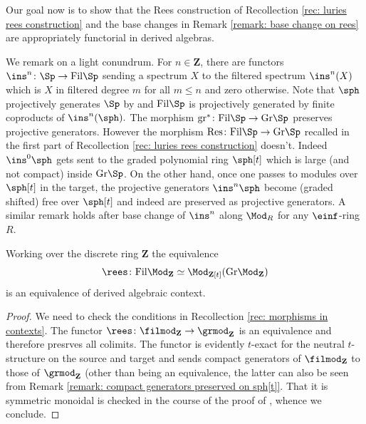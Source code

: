 \documentclass[10pt,reqno]{amsart}
\numberwithin{equation}{section}
\newcommand{\ZZ}{\mathbf{Z}}
\newcommand{\Gr}{\mathrm{Gr}}
\newcommand{\fil}{\mathrm{Fil}}
\newcommand{\gr}{\mathrm{gr}}
\newcommand{\res}{\mathrm{Res}}
\begin{document}
Our goal now is to show that the Rees construction of Recollection \ref{rec: luries rees construction} and the base changes in Remark \ref{remark: base change on rees} are appropriately functorial in derived algebras.


\begin{remark}\label{remark: compact generators preserved on sph[t]}
We remark on a light conundrum. 
    For $n\in \ZZ$, there are functors $\ins^n\colon \Sp \to \fil\Sp$ sending a spectrum $X$ to the filtered spectrum $\ins^n(X)$ which is $X$ in filtered degree $m$ for all $m\leq n$ and zero otherwise. Note that $\sph$ projectively generates $\Sp$ by \cite[Corollary 7.1.4.15]{HA} and $\fil\Sp$ is projectively generated by finite coproducts of $\ins^n(\sph).$ 
    The morphism $\gr^*\colon \fil\Sp\to \Gr\Sp$ preserves projective generators. However the morphism $\res\colon \fil\Sp\to \Gr\Sp$ recalled in the first part of Recollection \ref{rec: luries rees construction}  doesn't. Indeed $\ins^0\sph$ gets sent to the graded polynomial ring $\sph[t]$ which is large (and not compact) inside $\Gr\Sp$. On the other hand, once one passes to modules over $\sph[t]$ in the target, the projective generators $\ins^n\sph$ become (graded shifted) free over $\sph[t]$ and indeed are preserved as projective generators. A similar remark holds after base change of $\ins^n$ along $\Mod_R$ for any $\einf$-ring $R.$ 
\end{remark}


\begin{lemma}\label{lem: res is contexts}
    Working over the discrete ring $\ZZ$ the equivalence $$\rees\colon \fil\Mod_\ZZ\simeq \Mod_{\ZZ[t]}(\Gr\Mod_\ZZ)$$ is an equivalence of derived algebraic context.
\end{lemma}
\begin{proof}
We need to check the conditions in Recollection \ref{rec: morphisms in contexts}.
    The functor $\rees\colon \filmod_\ZZ\to \grmod_\ZZ$ is an equivalence and therefore presrves all colimits. 
    The functor is evidently $t$-exact for the neutral $t$-structure on the source and target and sends compact generators of $\filmod_\ZZ$ to those of $\grmod_\ZZ$ (other than being an equivalence, the latter can also be seen from Remark \ref{remark: compact generators preserved on sph[t]}. 
    That it is symmetric monoidal is checked in the course of the proof of \cite[Proposition 3.1.6]{Lurie2015RotationInvarianceKTheory}, whence we conclude.
    \end{proof}
\end{document}
